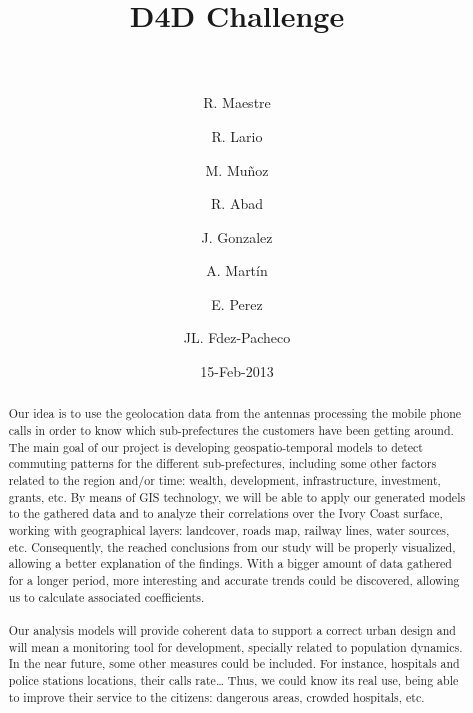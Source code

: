 \documentclass[a4paper,11pt]{article}
\begin{document}
\title{{\huge D4D Challenge} \\  \\ }

\author[1]{R. Maestre}
\author[1]{R. Lario}
\author[1]{M. Muñoz}
\author[1]{R. Abad}
\author[1]{J. Gonzalez}
\author[1]{A. Martín}
\author[2]{E. Perez}
\author[3]{JL. Fdez-Pacheco}


\date{15-Feb-2013}

\maketitle

\begin{abstract}
Our idea is to use the geolocation data from the antennas processing the mobile phone calls in order to know which sub-prefectures the customers have been getting around. The main goal of our project is developing geospatio-temporal models to detect commuting patterns for the different sub-prefectures, including some other factors related to the region and/or time: wealth, development, infrastructure, investment, grants, etc.
By means of GIS technology, we will be able to apply our generated models to the gathered data and to analyze their correlations over the Ivory Coast surface, working with geographical layers: landcover, roads map, railway lines, water sources, etc. Consequently, the reached conclusions from our study will be properly visualized, allowing a better explanation of the findings. With a bigger amount of data gathered for a longer period, more interesting and accurate trends could be discovered, allowing us to calculate associated coefficients.
\\
\\
Our analysis models will provide coherent data to support a correct urban design and will mean a monitoring tool for development, specially related to population dynamics.
In the near future, some other measures could be included. For instance, hospitals and police stations locations, their calls rate… Thus, we could know its real use, being able to improve their service to the citizens: dangerous areas, crowded hospitals, etc.
\\
\\
\end{abstract}
\end{document}
